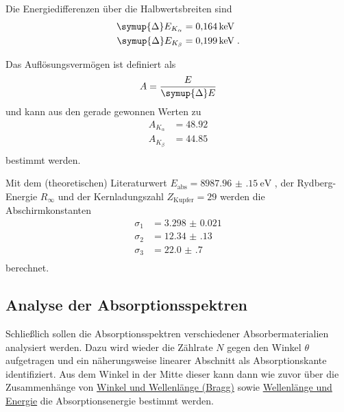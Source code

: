 Die Energiedifferenzen über die Halbwertsbreiten sind
\begin{align*}
    \symup{\Delta}E_{K_\alpha} &= \SI{0.164}{\kilo\electronvolt} \\
    \symup{\Delta}E_{K_\beta}  &= \SI{0.199}{\kilo\electronvolt} \; .
\end{align*}


Das Auflösungsvermögen ist definiert als
\begin{equation*}
    A = \frac{E}{\symup{\Delta}E}
\end{equation*}
und kann aus den gerade gewonnen Werten zu
\begin{align*}
    A_{K_\alpha} &= \num{48.92} \\
    A_{K_\beta}  &= \num{44.85} \\
\end{align*}
bestimmt werden.


Mit dem (theoretischen) Literaturwert $E_\text{abs} = \SI{8987.96(15)}{\electronvolt}$ \cite{eabs},
der Rydberg-Energie $R_\infty$ und der Kernladungszahl $Z_\text{Kupfer} = 29$ werden die Abschirmkonstanten
\begin{align*}
    \sigma_1 &= \num{3.298(21)} \\ %
    \sigma_2 &= \num{12.34(13)} \\ %
    \sigma_3 &= \num{22.0(7)}   \\ %
\end{align*}
berechnet.


\subsection{Analyse der Absorptionsspektren}
\label{sec:auswertung:absorptionsspektren}

Schließlich sollen die Absorptionsspektren verschiedener Absorbermaterialien analysiert werden.
Dazu wird wieder die Zählrate $N$ gegen den Winkel $\theta$ aufgetragen
und ein näherungsweise linearer Abschnitt als Absorptionskante identifiziert.
Aus dem Winkel in der Mitte dieser kann dann wie zuvor
über die Zusammenhänge von
\hyperref[eqn:BraggBedingung]{Winkel und Wellenlänge (Bragg)} sowie
\hyperref[eqn:lambda_to_E]{Wellenlänge und Energie}
die Absorptionsenergie bestimmt werden.

